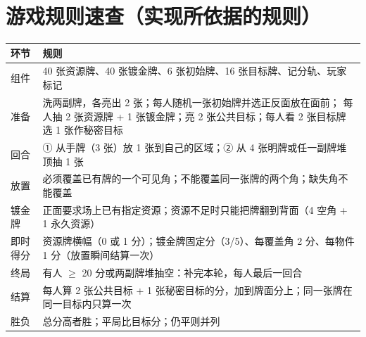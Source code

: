 \section{游戏规则速查（实现所依据的规则）}
\begin{longtable}{p{3.4cm}p{10.6cm}}
\toprule
环节 & 规则 \\
\midrule
组件 & 40 张资源牌、40 张镀金牌、6 张初始牌、16 张目标牌、记分轨、玩家标记 \\
准备 & 洗两副牌，各亮出 2 张；每人随机一张初始牌并选正反面放在面前；
每人抽 2 张资源牌 + 1 张镀金牌；亮 2 张公共目标；每人看 2 张目标牌选 1 张作秘密目标 \\
回合 & ① 从手牌（3 张）放 1 张到自己的区域；② 从 4 张明牌或任一副牌堆顶抽 1 张 \\
放置 & 必须覆盖已有牌的一个可见角；不能覆盖同一张牌的两个角；缺失角不能覆盖 \\
镀金牌 & 正面要求场上已有指定资源；资源不足时只能把牌翻到背面（4 空角 + 1 永久资源） \\
即时得分 & 资源牌横幅（0 或 1 分）；镀金牌固定分（3/5）、每覆盖角 2 分、每物件 1 分（放置瞬间结算一次） \\
终局 & 有人 $\ge$ 20 分或两副牌堆抽空：补完本轮，每人最后一回合 \\
结算 & 每人算 2 张公共目标 + 1 张秘密目标的分，加到牌面分上；同一张牌在同一目标内只算一次 \\
胜负 & 总分高者胜；平局比目标分；仍平则并列 \\
\bottomrule
\end{longtable}

